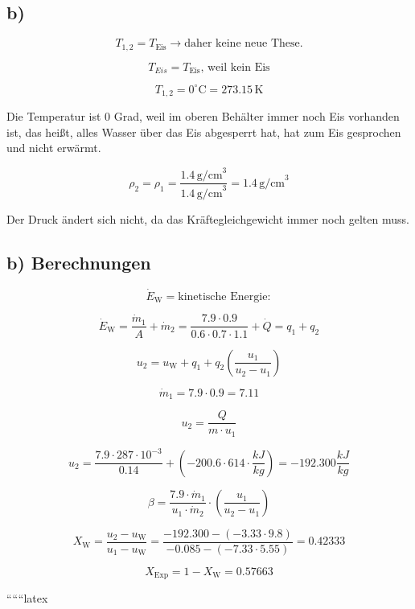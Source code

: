

\subsection*{b)}

\[
T_{1,2} = T_{\text{Eis}} \rightarrow \text{daher keine neue These.}
\]

\[
T_{Eis} = T_{\text{Eis}}, \, \text{weil kein Eis}
\]

\[
T_{1,2} = 0^\circ \text{C} = 273.15 \, \text{K}
\]

Die Temperatur ist 0 Grad, weil im oberen Behälter immer noch Eis vorhanden ist, das heißt, alles Wasser über das Eis abgesperrt hat, hat zum Eis gesprochen und nicht erwärmt.

\[
\rho_2 = \rho_1 = \frac{1.4 \, \text{g/cm}^3}{1.4 \, \text{g/cm}^3} = 1.4 \, \text{g/cm}^3
\]

Der Druck ändert sich nicht, da das Kräftegleichgewicht immer noch gelten muss.

\subsection*{b) Berechnungen}

\[
\dot{E}_{\text{W}} = \text{kinetische Energie}:
\]

\[
\dot{E}_{\text{W}} = \frac{\dot{m}_1}{A} + \dot{m}_2 = \frac{7.9 \cdot 0.9}{0.6 \cdot 0.7 \cdot 1.1} + \dot{Q} = q_1 + q_2
\]

\[
u_2 = u_{\text{W}} + q_1 + q_2 \left( \frac{u_1}{u_2 - u_1} \right)
\]

\[
\dot{m}_1 = 7.9 \cdot 0.9 = 7.11
\]

\[
u_2 = \frac{Q}{m \cdot u_1}
\]

\[
u_2 = \frac{7.9 \cdot 287 \cdot 10^{-3}}{0.14} + \left( -200.6 \cdot 614 \cdot \frac{kJ}{kg} \right) = -192.300 \frac{kJ}{kg}
\]

\[
\beta = \frac{7.9 \cdot \dot{m}_1}{u_1 \cdot \dot{m}_2} \cdot \left( \frac{u_1}{u_2 - u_1} \right)
\]

\[
X_{\text{W}} = \frac{u_2 - u_{\text{W}}}{u_1 - u_{\text{W}}} = \frac{-192.300 - (-3.33 \cdot 9.8)}{-0.085 - (-7.33 \cdot 5.55)} = 0.42333
\]

\[
X_{\text{Exp}} = 1 - X_{\text{W}} = 0.57663
\]

``````latex